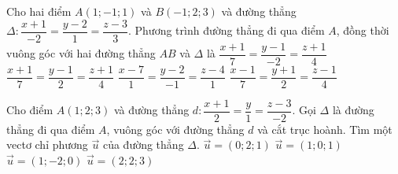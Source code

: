 \begin{ex}%
	Cho hai điểm $A(1;-1;1)$ và $B(-1;2;3)$ và đường thẳng $\Delta\colon\dfrac{x+1}{-2}=\dfrac{y-2}{1}=\dfrac{z-3}{3}$. Phương trình đường thẳng đi qua điểm $A$, đồng thời vuông góc với hai đường thẳng $AB$ và $\Delta$ là
	\choice
	{$\dfrac{x+1}{7}=\dfrac{y-1}{-2}=\dfrac{z+1}{4}$}
	{$\dfrac{x+1}{7}=\dfrac{y-1}{2}=\dfrac{z+1}{4}$}
	{$\dfrac{x-7}{1}=\dfrac{y-2}{-1}=\dfrac{z-4}{1}$}
	{\True $\dfrac{x-1}{7}=\dfrac{y+1}{2}=\dfrac{z-1}{4}$}
\end{ex}


\begin{ex}
	Cho điểm $A(1;2;3)$ và đường thẳng $d: \dfrac{x+1}{2}=\dfrac{y}{1}=\dfrac{z-3}{-2}$. Gọi $\Delta$ là đường thẳng đi qua điểm $A$, vuông góc với đường thẳng $d$ và cắt trục hoành. Tìm một vectơ chỉ phương $\overrightarrow{u}$ của đường thẳng $\Delta$.
	\choice
	{$\overrightarrow{u}=(0;2;1)$}
	{$\overrightarrow{u}=(1;0;1)$}
	{$\overrightarrow{u}=(1;-2;0)$}
	{\True $\overrightarrow{u}=(2;2;3)$}
	\loigiai{
	}
\end{ex}

